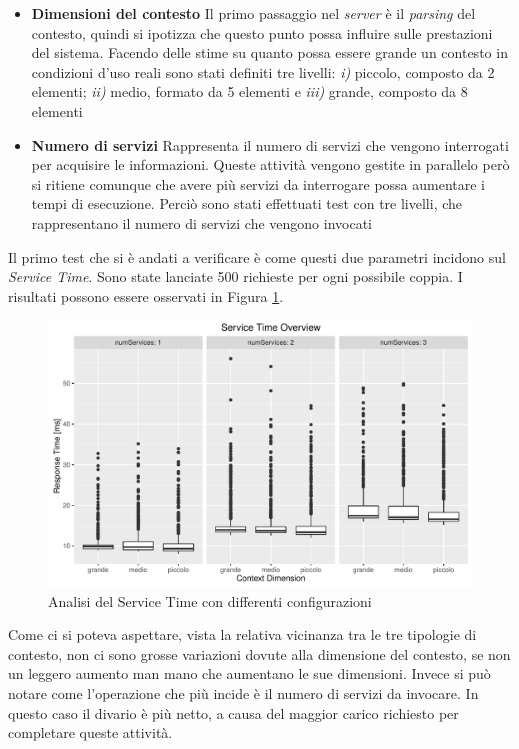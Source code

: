 \begin{itemize}
	\item \textbf{Dimensioni del contesto}
	Il primo passaggio nel \emph{server} è il \emph{parsing} del contesto, quindi si ipotizza che questo punto possa influire sulle prestazioni del sistema. Facendo delle stime su quanto possa essere grande un contesto in condizioni d'uso reali sono stati definiti tre livelli: \emph{i)} piccolo, composto da 2 elementi; \emph{ii)} medio, formato da 5 elementi e \emph{iii)} grande, composto da 8 elementi
	\item \textbf{Numero di servizi}
	Rappresenta il numero di servizi che vengono interrogati per acquisire le informazioni. Queste attività vengono gestite in parallelo però si ritiene comunque che avere più servizi da interrogare possa aumentare i tempi di esecuzione. Perciò sono stati effettuati test con tre livelli, che rappresentano il numero di servizi che vengono invocati
\end{itemize}

Il primo test che si è andati a verificare è come questi due parametri incidono sul \emph{Service Time}. Sono state lanciate 500 richieste per ogni possibile coppia. I risultati possono essere osservati in Figura \ref{fig:service-time-overview}.

\begin{figure}[ht]
	\centering
	\includegraphics[width=\textwidth]{7-performance/Immagini/service_time_overview.pdf}
	\caption{Analisi del Service Time con differenti configurazioni}\label{fig:service-time-overview}
\end{figure}

Come ci si poteva aspettare, vista la relativa vicinanza tra le tre tipologie di contesto, non ci sono grosse variazioni dovute alla dimensione del contesto, se non un leggero aumento man mano che aumentano le sue dimensioni. Invece si può notare come l'operazione che più incide è il numero di servizi da invocare. In questo caso il divario è più netto, a causa del maggior carico richiesto per completare queste attività.

